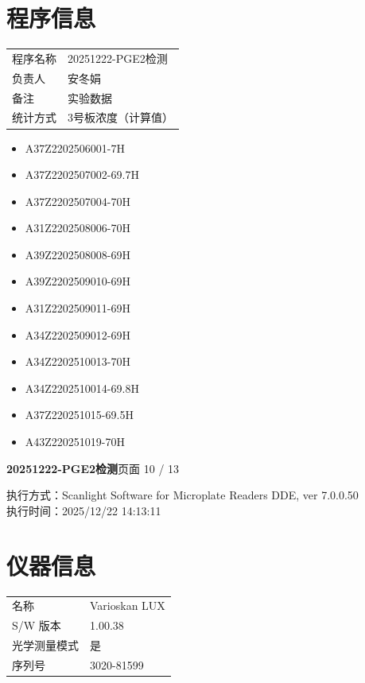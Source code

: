 \documentclass[UTF8,10pt,a4paper,fontset=fandol]{ctexart}
\begin{document}
\section*{程序信息}

\begin{tabular}{@{}ll@{}}
程序名称 & 20251222-PGE2检测\\
负责人   & 安冬娟\\
备注     & 实验数据\\
统计方式 & 3号板浓度（计算值）\\
\end{tabular}

\begin{itemize}
\item A37Z2202506001-7H
\item A37Z2202507002-69.7H
\item A37Z2202507004-70H
\item A31Z2202508006-70H
\item A39Z2202508008-69H
\item A39Z2202509010-69H
\item A31Z2202509011-69H
\item A34Z2202509012-69H
\item A34Z2202510013-70H
\item A34Z2202510014-69.8H
\item A37Z220251015-69.5H
\item A43Z220251019-70H
\end{itemize}


\newpage

\noindent\textbf{20251222-PGE2检测}\hfill 页面 10 / 13

\noindent
执行方式：Scanlight Software for Microplate Readers DDE, ver 7.0.0.50\\
执行时间：2025/12/22 14:13:11

\section{仪器信息}

\begin{tabular}{@{}p{3.2cm}p{9.5cm}@{}}
名称 & Varioskan LUX \\
S/W 版本 & 1.00.38 \\
光学测量模式 & 是 \\
序列号 & 3020-81599 \\
\end{tabular}
\end{document}
